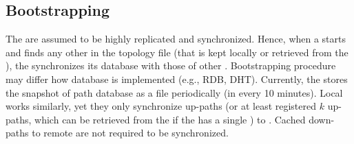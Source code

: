 \subsection{Bootstrapping}
The \TDC \PS are assumed to be highly replicated and synchronized. Hence, when a \PS starts and finds any other \PSs in the topology file (that is kept locally or retrieved from the \CS), the \PS synchronizes its database with those of other \PSs. Bootstrapping procedure may differ how \PS database is implemented (e.g., RDB, DHT). Currently, the \PS stores the snapshot of path database as a file periodically (in every 10 minutes). Local \PSs works similarly, yet they only synchronize up-paths (or at least registered $k$ up-paths, which can be retrieved from the \BS if the \AD has a single \PS) to \TDC. Cached down-paths to remote \ADs are not required to be synchronized. 



